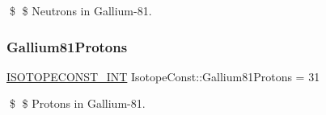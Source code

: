 \$ \$ Neutrons in Gallium-\/81. \mbox{\label{group___isotope_const-_gallium-_ga81_ga1a7f596ca2245479930e89337d3a39e8}} 
\subsubsection{\texorpdfstring{Gallium81\+Protons}{Gallium81Protons}}
{\footnotesize\ttfamily \mbox{\hyperlink{group___isotope_const-_macros_ga5f18360b3e99483a35c32d789e62621c}{I\+S\+O\+T\+O\+P\+E\+C\+O\+N\+S\+T\+\_\+\+I\+NT}} Isotope\+Const\+::\+Gallium81\+Protons = 31}

\$ \$ Protons in Gallium-\/81. 